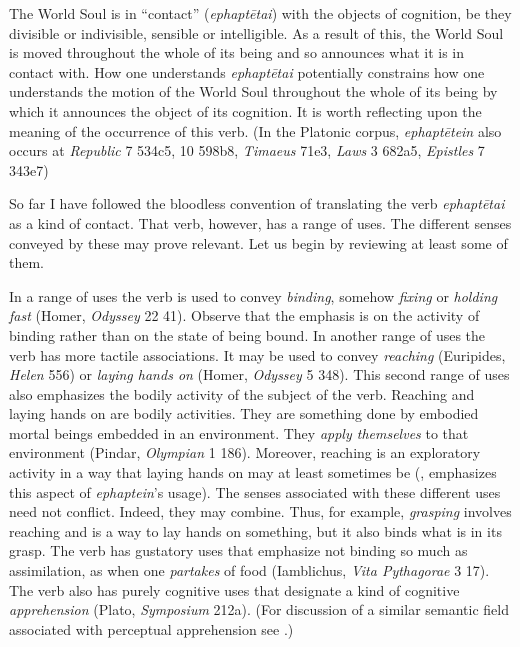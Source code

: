 The World Soul is in ``contact'' (\emph{ephaptētai}) with the objects of cognition, be they divisible or indivisible, sensible or intelligible. As a result of this, the World Soul is moved throughout the whole of its being and so announces what it is in contact with. How one understands \emph{ephaptētai} potentially constrains how one understands the motion of the World Soul throughout the whole of its being by which it announces the object of its cognition. It is worth reflecting upon the meaning of the occurrence of this verb. (In the Platonic corpus, \emph{ephaptētein} also occurs at \emph{Republic} 7 534c5, 10 598b8, \emph{Timaeus} 71e3, \emph{Laws} 3 682a5, \emph{Epistles} 7 343e7)

So far I have followed the bloodless convention of translating the verb \emph{ephaptētai} as a kind of contact. That verb, however, has a range of uses. The different senses conveyed by these may prove relevant. Let us begin by reviewing at least some of them.

In a range of uses the verb is used to convey \emph{binding}, somehow \emph{fixing} or \emph{holding fast} (Homer, \emph{Odyssey} 22 41). Observe that the emphasis is on the activity of binding rather than on the state of being bound. In another range of uses the verb has more tactile associations. It may be used to convey \emph{reaching} (Euripides, \emph{Helen} 556) or \emph{laying hands on} (Homer, \emph{Odyssey} 5 348). This second range of uses also emphasizes the bodily activity of the subject of the verb. Reaching and laying hands on are bodily activities. They are something done by embodied mortal beings embedded in an environment. They \emph{apply themselves} to that environment (Pindar, \emph{Olympian} 1 186). Moreover, reaching is an exploratory activity in a way that laying hands on may at least sometimes be (\citealt[134]{Betegh:2019fq}, emphasizes this aspect of \emph{ephaptein}'s usage). The senses associated with these different uses need not conflict. Indeed, they may combine. Thus, for example, \emph{grasping} involves reaching and is a way to lay hands on something, but it also binds what is in its grasp. The verb has gustatory uses that emphasize not binding so much as assimilation, as when one \emph{partakes} of food (Iamblichus, \emph{Vita Pythagorae} 3 17). The verb also has purely cognitive uses that designate a kind of cognitive \emph{apprehension} (Plato, \emph{Symposium} 212a). (For discussion of a similar semantic field associated with perceptual apprehension see \citealt[chapters 1--2]{Kalderon:2018oe}.)

